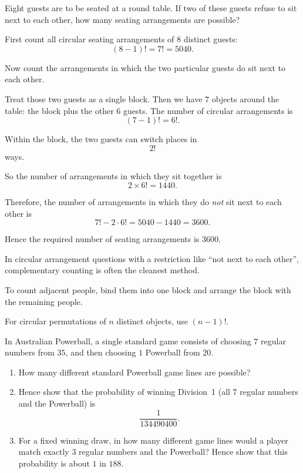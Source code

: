 \begin{problem}
Eight guests are to be seated at a round table. If two of these guests refuse to sit next to each other, how many seating arrangements are possible?
\end{problem}

\begin{solution}
First count all circular seating arrangements of $8$ distinct guests:
\[
(8-1)! = 7! = 5040.
\]

Now count the arrangements in which the two particular guests do sit next to each other.

Treat those two guests as a single block. Then we have $7$ objects around the table: the block plus the other $6$ guests. The number of circular arrangements is
\[
(7-1)! = 6!.
\]

Within the block, the two guests can switch places in
\[
2!
\]
ways.

So the number of arrangements in which they sit together is
\[
2 \times 6! = 1440.
\]

Therefore, the number of arrangements in which they do \emph{not} sit next to each other is
\[
7! - 2\cdot 6! = 5040 - 1440 = 3600.
\]

Hence the required number of seating arrangements is $\boxed{3600}$.
\end{solution}

\begin{takeaways}
\item In circular arrangement questions with a restriction like ``not next to each other'', complementary counting is often the cleanest method.
\item To count adjacent people, bind them into one block and arrange the block with the remaining people.
\item For circular permutations of $n$ distinct objects, use $(n-1)!$.
\end{takeaways}

\begin{problem}
In Australian Powerball, a single standard game consists of choosing $7$ regular numbers from $35$, and then choosing $1$ Powerball from $20$.

\begin{enumerate}[label=\roman*)]
\item How many different standard Powerball game lines are possible?
\item Hence show that the probability of winning Division~1 (all $7$ regular numbers and the Powerball) is
\[
\frac{1}{134490400}.
\]
\item For a fixed winning draw, in how many different game lines would a player match exactly $3$ regular numbers and the Powerball? Hence show that this probability is about $1$ in $188$.
\end{enumerate}
\end{problem}

